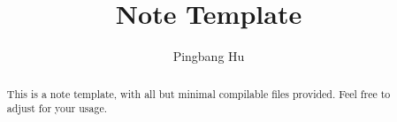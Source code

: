 \documentclass[a4paper]{article}
\author{Pingbang Hu}
\title{Note Template}
\begin{document}
\maketitle

\begin{abstract}
	This is a note template, with all but minimal compilable files provided. Feel free to adjust for your usage.
\end{abstract}

\tableofcontents


\newpage
\appendix
\appendixpage



\newpage
\printbibliography
\end{document}
